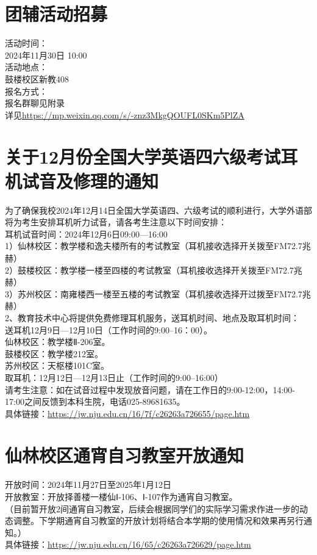 \documentclass[letterpaper, 12pt]{article}
\begin{document}
\begin{multicols}{2}
\section{团辅活动招募}
活动时间：\\
2024年11月30日 10:00\\
活动地点：\\
鼓楼校区新教408\\
报名方式：\\
报名群聊见附录\\
详见\url{https://mp.weixin.qq.com/s/-znz3MkgQOUFL0SKm5PlZA}

\section{关于12月份全国大学英语四六级考试耳机试音及修理的通知}
为了确保我校2024年12月14日全国大学英语四、六级考试的顺利进行，大学外语部将为考生安排耳机听力试音，请各考生注意以下时间安排：\\
耳机试音时间：2024年12月6日09:00—16:00\\
1）仙林校区：教学楼和逸夫楼所有的考试教室（耳机接收选择开关拨至FM72.7兆赫）\\
2）鼓楼校区：教学楼一楼至四楼的考试教室（耳机接收选择开关拨至FM72.7兆赫）\\
3）苏州校区：南雍楼西一楼至五楼的考试教室（耳机接收选择开过拨至FM72.7兆赫）\\
2、教育技术中心将提供免费修理耳机服务，送耳机时间、地点及取耳机时间：\\
送耳机12月9日—12月10日（工作时间的9:00--16：00）。\\
仙林校区：教学楼Ⅱ-206室。\\
鼓楼校区：教学楼212室。\\
苏州校区：天枢楼101C室。\\
取耳机：12月12日—12月13日止（工作时间的9:00--16:00）\\
请考生注意：如在试音过程中发现放音问题，请在工作日的9:00-12:00，14:00-17:00之间反馈到本科生院，电话025-89681635。\\
具体链接：\url{https://jw.nju.edu.cn/16/7f/c26263a726655/page.htm}\\

\section{仙林校区通宵自习教室开放通知}
开放时间：2024年11月27日至2025年1月12日\\
开放教室：开放择善楼一楼仙Ⅰ-106、Ⅰ-107作为通宵自习教室。\\
（目前暂开放2间通宵自习教室，后续会根据同学们的实际学习需求作进一步的动态调整。下学期通宵自习教室的开放计划将结合本学期的使用情况和效果再另行通知。）\\
具体链接：\url{https://jw.nju.edu.cn/16/65/c26263a726629/page.htm}\\


\end{multicols}
\end{document}
